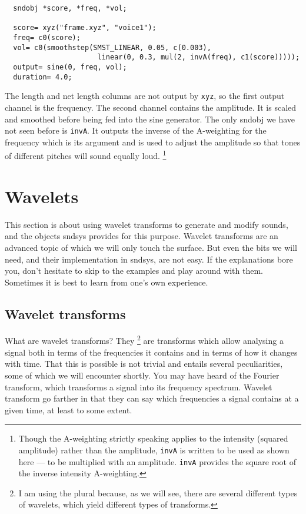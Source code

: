\documentclass{article}
\def\s{{\sc sndsys} }
\def\sn{{\sc sndsys}}
\def\bv{\begin{verbatim}}
\begin{document}
\bv
  sndobj *score, *freq, *vol;

  score= xyz("frame.xyz", "voice1");
  freq= c0(score);
  vol= c0(smoothstep(SMST_LINEAR, 0.05, c(0.003), 
                      linear(0, 0.3, mul(2, invA(freq), c1(score)))));
  output= sine(0, freq, vol);
  duration= 4.0;
\end{verbatim}

The length and net length columns are not output by {\tt xyz}, so the first
output channel is the frequency.  The second channel contains the amplitude.
It is scaled and smoothed before being fed into the sine generator.  The only
sndobj we have not seen before is {\tt invA}.  It outputs the inverse of the
A-weighting for the frequency which is its argument and is used to adjust the
amplitude so that tones of different pitches will sound equally loud.%
%
\footnote{Though the A-weighting strictly speaking applies to the intensity
(squared amplitude) rather than the amplitude, {\tt invA} is written to be used
as shown here --- to be multiplied with an amplitude.  {\tt invA} provides the
square root of the inverse intensity A-weighting.}




\section{Wavelets}
\label{sec:wavelets}

This section is about using wavelet transforms to generate and modify sounds,
and the objects \s provides for this purpose.  Wavelet transforms are an
advanced topic of which we will only touch the surface.  But even the bits we
will need, and their implementation in \sn, are not easy.  If the explanations
bore you, don't hesitate to skip to the examples and play around with them.
Sometimes it is best to learn from one's own experience.


\subsection{Wavelet transforms}

What are wavelet transforms?  They%
%
\footnote{I am using the plural because, as we will see, there are several
different types of wavelets, which yield different types of transforms.}
%
are transforms which allow analysing a signal both in terms of the frequencies
it contains and in terms of how it changes with time.  That this is possible is
not trivial and entails several peculiarities, some of which we will encounter
shortly.  You may have heard of the Fourier transform, which transforms a
signal into its frequency spectrum.  Wavelet transform go farther in that they
can say which frequencies a signal contains at a given time, at least to some
extent.
\end{document}
